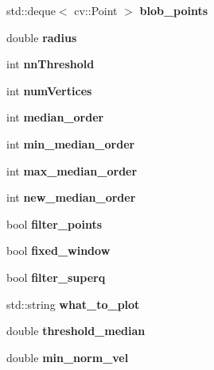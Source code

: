 \begin{DoxyCompactItemize}
\item 
std\-::deque$<$ cv\-::\-Point $>$ {\bfseries blob\-\_\-points}\label{classSuperqModule_a571d62b869e77e87b5fad6a13a72f813}

\item 
double {\bfseries radius}\label{classSuperqModule_a0751c095220723cf7d8b25b5d45a92e1}

\item 
int {\bfseries nn\-Threshold}\label{classSuperqModule_ab7798766f824ed28f1f4dae8a3f1356c}

\item 
int {\bfseries num\-Vertices}\label{classSuperqModule_a9cc4835f5280e71876b76331288b8dc2}

\item 
int {\bfseries median\-\_\-order}\label{classSuperqModule_ae2d1a7a9301e43d148afda36fddd87b4}

\item 
int {\bfseries min\-\_\-median\-\_\-order}\label{classSuperqModule_a96b534ae428e744f2b44d35866490fdc}

\item 
int {\bfseries max\-\_\-median\-\_\-order}\label{classSuperqModule_a1d1b6f621d446969d9a8aa9abfafa7f9}

\item 
int {\bfseries new\-\_\-median\-\_\-order}\label{classSuperqModule_a1409f49f4c5824ec604ce214654d3e22}

\item 
bool {\bfseries filter\-\_\-points}\label{classSuperqModule_aa1bc1b1b7d3ef1b287d0c8d15d9a51bc}

\item 
bool {\bfseries fixed\-\_\-window}\label{classSuperqModule_a07ff8af914d2f3b5ae9fbc03b94954e7}

\item 
bool {\bfseries filter\-\_\-superq}\label{classSuperqModule_a3e824c0b36749d3e9d2ff755004b7472}

\item 
std\-::string {\bfseries what\-\_\-to\-\_\-plot}\label{classSuperqModule_a1f1963d5a8947368cec96d4fbcc3ec79}

\item 
double {\bfseries threshold\-\_\-median}\label{classSuperqModule_a226a730b20160c8e6483bd3b1064a7bc}

\item 
double {\bfseries min\-\_\-norm\-\_\-vel}\label{classSuperqModule_ace8ceaaf035427634c78f3d720ab2432}


\end{DoxyCompactItemize}
